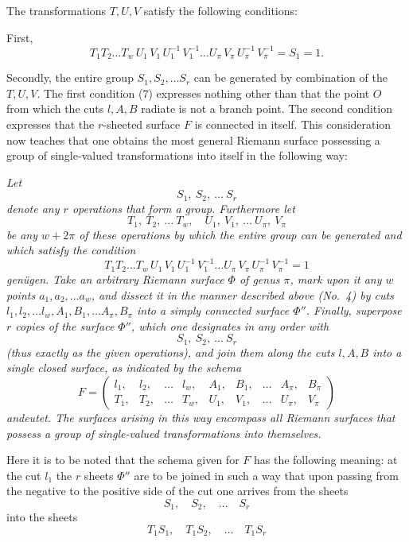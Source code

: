 \documentclass{article}
\begin{document}
The transformations $T, U, V$ satisfy the following conditions:

First,
\[
T_1 T_2 \dots T_w \, U_1 \, V_1 \, U_1^{-1} \, V_1^{-1} \dots U_\pi \, V_\pi \, U_\pi^{-1} \, V_\pi^{-1} = S_1 = 1.
\tag{7}
\]

Secondly, the entire group $S_1, S_2, \dots S_r$ can be generated by combination of the $T, U, V$. The first condition (7) expresses nothing other than that the point $O$ from which the cuts $l, A, B$ radiate is not a branch point. The second condition expresses that the $r$-sheeted surface $F$ is connected in itself. This consideration now teaches that one obtains the most general Riemann surface possessing a group of single-valued transformations into itself in the following way:

\emph{Let}
\[
S_1, \ S_2, \ \dots \ S_r
\]
\emph{denote any $r$ operations that form a group. Furthermore let}
\[
T_1, \ T_2, \ \dots \ T_w, \quad U_1, \ V_1, \ \dots \ U_\pi, \ V_\pi
\]
\emph{be any $w + 2\pi$ of these operations by which the entire group can be generated and which satisfy the condition}
\[
T_1 T_2 \dots T_w \, U_1 \, V_1 \, U_1^{-1} \, V_1^{-1} \dots U_\pi \, V_\pi \, U_\pi^{-1} \, V_\pi^{-1} = 1
\]
\emph{genügen. Take an arbitrary Riemann surface $\Phi$ of genus $\pi$, mark upon it any $w$ points $a_1, a_2, \dots a_w$, and dissect it in the manner described above (No.~4) by cuts $l_1, l_2, \dots l_w, A_1, B_1, \dots A_\pi, B_\pi$ into a simply connected surface $\Phi''$. Finally, superpose $r$ copies of the surface $\Phi''$, which one designates in any order with}
\[
S_1, \ S_2, \ \dots \ S_r
\]
\emph{(thus exactly as the given operations), and join them along the cuts $l, A, B$ into a single closed surface, as indicated by the schema}
\[
F = \begin{pmatrix}
l_1, & l_2, & \dots & l_w, & A_1, & B_1, & \dots & A_\pi, & B_\pi \\
T_1, & T_2, & \dots & T_w, & U_1, & V_1, & \dots & U_\pi, & V_\pi
\end{pmatrix}
\]
\emph{andeutet. The surfaces arising in this way encompass all Riemann surfaces that possess a group of single-valued transformations into themselves.}

Here it is to be noted that the schema given for $F$ has the following meaning: at the cut $l_1$ the $r$ sheets $\Phi''$ are to be joined in such a way that upon passing from the negative to the positive side of the cut one arrives from the sheets
\[
S_1, \quad S_2, \quad \dots \quad S_r
\]
into the sheets
\[
T_1 S_1, \quad T_1 S_2, \quad \dots \quad T_1 S_r
\]
\end{document}
